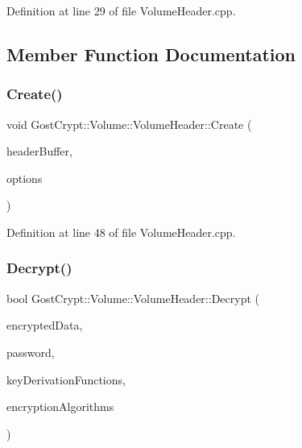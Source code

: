 Definition at line 29 of file Volume\+Header.\+cpp.



\subsection{Member Function Documentation}
\mbox{\label{class_gost_crypt_1_1_volume_1_1_volume_header_aae6649483930b381ba33251d1fa3eac8}} 
\subsubsection{\texorpdfstring{Create()}{Create()}}
{\footnotesize\ttfamily void Gost\+Crypt\+::\+Volume\+::\+Volume\+Header\+::\+Create (\begin{DoxyParamCaption}\item[{\hyperlink{class_gost_crypt_1_1_buffer_ptr}{Buffer\+Ptr} \&}]{header\+Buffer,  }\item[{\hyperlink{struct_gost_crypt_1_1_volume_1_1_volume_header_creation_options}{Volume\+Header\+Creation\+Options} \&}]{options }\end{DoxyParamCaption})}



Definition at line 48 of file Volume\+Header.\+cpp.

\mbox{\label{class_gost_crypt_1_1_volume_1_1_volume_header_a498878278e9415c2475e0fe53da56978}} 
\subsubsection{\texorpdfstring{Decrypt()}{Decrypt()}}
{\footnotesize\ttfamily bool Gost\+Crypt\+::\+Volume\+::\+Volume\+Header\+::\+Decrypt (\begin{DoxyParamCaption}\item[{const \hyperlink{class_gost_crypt_1_1_buffer_ptr}{Buffer\+Ptr} \&}]{encrypted\+Data,  }\item[{const \hyperlink{class_gost_crypt_1_1_volume_1_1_volume_password}{Volume\+Password} \&}]{password,  }\item[{const \hyperlink{namespace_gost_crypt_1_1_volume_a513257938e5ea0554ad83d0eb08f8f67}{Volume\+Hash\+List} \&}]{key\+Derivation\+Functions,  }\item[{const \hyperlink{namespace_gost_crypt_1_1_volume_ae58c307b345c639d35f6dc68af4017b5}{Encryption\+Algorithm\+List} \&}]{encryption\+Algorithms }\end{DoxyParamCaption})}



